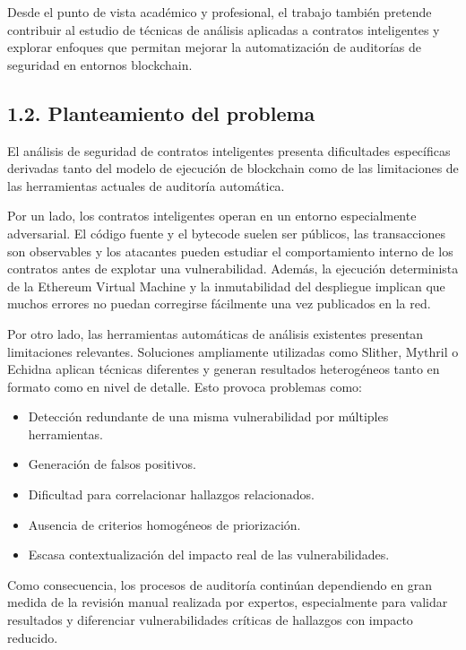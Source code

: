 Desde el punto de vista académico y profesional, el trabajo también
pretende contribuir al estudio de técnicas de análisis aplicadas a
contratos inteligentes y explorar enfoques que permitan mejorar la
automatización de auditorías de seguridad en entornos blockchain.

\subsection{1.2. Planteamiento del
problema}\label{planteamiento-del-problema}

El análisis de seguridad de contratos inteligentes presenta dificultades
específicas derivadas tanto del modelo de ejecución de blockchain como
de las limitaciones de las herramientas actuales de auditoría
automática.

Por un lado, los contratos inteligentes operan en un entorno
especialmente adversarial. El código fuente y el bytecode suelen ser
públicos, las transacciones son observables y los atacantes pueden
estudiar el comportamiento interno de los contratos antes de explotar
una vulnerabilidad. Además, la ejecución determinista de la Ethereum
Virtual Machine y la inmutabilidad del despliegue implican que muchos
errores no puedan corregirse fácilmente una vez publicados en la red.

Por otro lado, las herramientas automáticas de análisis existentes
presentan limitaciones relevantes. Soluciones ampliamente utilizadas
como Slither, Mythril o Echidna aplican técnicas diferentes y generan
resultados heterogéneos tanto en formato como en nivel de detalle. Esto
provoca problemas como:

\begin{itemize}
\tightlist
\item
  Detección redundante de una misma vulnerabilidad por múltiples
  herramientas.
\item
  Generación de falsos positivos.
\item
  Dificultad para correlacionar hallazgos relacionados.
\item
  Ausencia de criterios homogéneos de priorización.
\item
  Escasa contextualización del impacto real de las vulnerabilidades.
\end{itemize}

Como consecuencia, los procesos de auditoría continúan dependiendo en
gran medida de la revisión manual realizada por expertos, especialmente
para validar resultados y diferenciar vulnerabilidades críticas de
hallazgos con impacto reducido.

